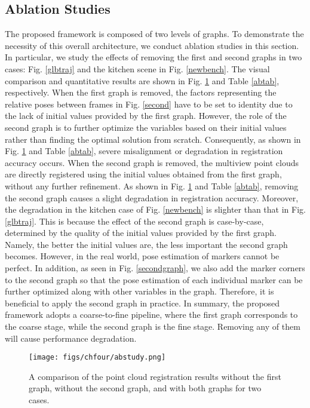 \subsection{Ablation Studies} \label{ab}
The proposed framework is composed of two levels of graphs. To demonstrate the necessity of this overall architecture, we conduct ablation studies in this section. In particular, we study the effects of removing the first and second graphs in two cases: Fig. \ref{glbtraj} and the kitchen scene in Fig. \ref{newbench}. The visual comparison and quantitative results are shown in Fig. \ref{abstudy} and Table \ref{abtab}, respectively. When the first graph is removed, the factors representing the relative poses between frames in Fig. \ref{second} have to be set to identity due to the lack of initial values provided by the first graph. 
%
However, the role of the second graph is to further optimize the variables based on their initial values rather than finding the optimal solution from scratch.
%
Consequently, as shown in Fig. \ref{abstudy} and Table \ref{abtab}, severe misalignment or degradation in registration accuracy occurs.
%
When the second graph is removed, the multiview point clouds are directly registered using the initial values obtained from the first graph, without any further refinement. 
%
As shown in Fig. \ref{abstudy} and Table \ref{abtab}, removing the second graph causes a slight degradation in registration accuracy.
%
Moreover, the degradation in the kitchen case of Fig. \ref{newbench} is slighter than that in Fig. \ref{glbtraj}.
%
This is because the effect of the second graph is case-by-case, determined by the quality of the initial values provided by the first graph. 
%
Namely, the better the initial values are, the less important the second graph becomes. However, in the real world, pose estimation of markers cannot be perfect. In addition, as seen in Fig. \ref{secondgraph}, we also add the marker corners to the second graph so that the pose estimation of each individual marker can be further optimized along with other variables in the graph.
%
Therefore, it is beneficial to apply the second graph in practice. In summary, the proposed framework adopts a coarse-to-fine pipeline, where the first graph corresponds to the coarse stage, while the second graph is the fine stage. Removing any of them will cause performance degradation.
\begin{figure}[h]
	\centering
  
	\texttt{[image: figs/chfour/abstudy.png]}

	\caption{ A comparison of the point cloud registration results without the first graph, without the second graph, and with both graphs for two cases. }
	\label{abstudy}

\end{figure}

